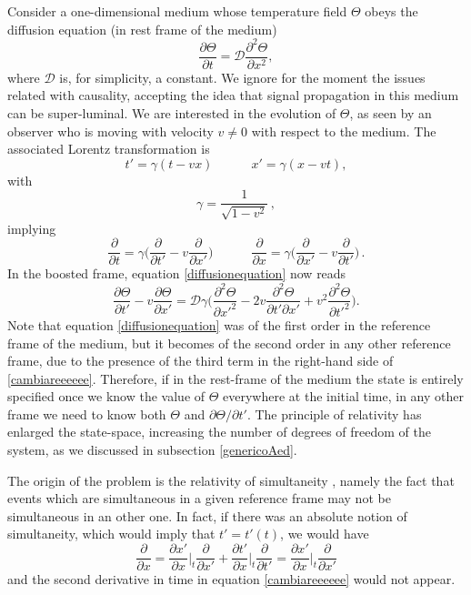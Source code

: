 \documentclass[a4paper, amsfonts, amssymb, amsmath, reprint, showkeys, nofootinbib, twoside]{revtex4-1}
\newcommand{\spc}{\quad \quad \quad}
\begin{document}
Consider a one-dimensional medium whose temperature field $\Theta$ obeys the diffusion equation (in rest frame of the medium)
%
\begin{equation}
\label{diffusionequation}
\dfrac{\partial \Theta}{\partial t} = \mathcal{D} \dfrac{\partial^2 \Theta}{\partial x^2},
\end{equation}
%
where $\mathcal{D}$ is, for simplicity, a constant. We ignore for the moment the issues related with causality, accepting the idea that signal propagation in this medium can be super-luminal. We are interested in the evolution of $\Theta$, as seen by an observer who is moving with velocity $v\neq 0$ with respect to the medium. The associated Lorentz transformation is
\begin{equation}\label{transf}
t' = \gamma (t-vx)  \spc  x' = \gamma (x-vt),
\end{equation}
with
\begin{equation}
\gamma = \dfrac{1}{\sqrt{1-v^2}} \, ,
\end{equation}
implying
\begin{equation}\label{parziale}
\dfrac{\partial}{\partial t} = \gamma \bigg( \dfrac{\partial}{\partial t'} - v \dfrac{\partial}{\partial x'} \bigg) \spc \dfrac{\partial}{\partial x} = \gamma \bigg( \dfrac{\partial}{\partial x'} - v \dfrac{\partial}{\partial t'} \bigg) \, .
\end{equation}
In the boosted frame, equation \eqref{diffusionequation} now reads 
\begin{equation}\label{cambiareeeeee}
\dfrac{\partial \Theta}{\partial t'} -v \dfrac{\partial \Theta}{\partial x'} = \mathcal{D} \gamma \bigg( \dfrac{\partial^2 \Theta}{\partial {x'}^2} - 2v\dfrac{\partial^2 \Theta}{\partial t' \partial x'} + v^2 \dfrac{\partial^2 \Theta}{\partial {t'}^2}  \bigg).
\end{equation}
Note that  equation  \eqref{diffusionequation} was of the first order in the reference frame of the medium, but it becomes of the second order in any other reference frame, due to the presence of the third term in the right-hand side of \eqref{cambiareeeeee}. 
Therefore, if in the rest-frame of the medium the state is entirely specified once we know the value of $\Theta$ everywhere at the initial time, in any other frame we need to know both $\Theta$ and $\partial \Theta/\partial t'$. The principle of relativity has enlarged the state-space, increasing the number of degrees of freedom of the system, as we discussed in subsection \ref{genericoAed}.

The origin of the problem is the relativity of simultaneity \citep{special_in_gen}, namely the fact that events which are simultaneous in a given reference frame may not be simultaneous in an other one. 
In fact, if there was an absolute notion of simultaneity, which would imply that $t'=t'(t)$, we would have
\begin{equation}
\dfrac{\partial}{\partial x} = \dfrac{\partial x'}{\partial x} \bigg|_t \dfrac{\partial}{\partial x'} + \dfrac{\partial t'}{\partial x}  \bigg|_t \dfrac{\partial}{\partial t'} = \dfrac{\partial x'}{\partial x}  \bigg|_t \dfrac{\partial}{\partial x'}
\end{equation}
and the second derivative in time in equation \eqref{cambiareeeeee} would not appear.
\end{document}
